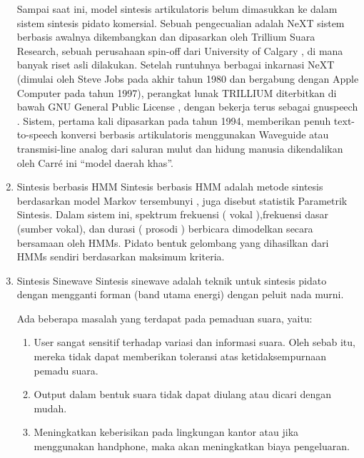 \begin{enumerate}
Sampai saat ini, model sintesis artikulatoris belum dimasukkan ke dalam sistem sintesis pidato komersial. Sebuah pengecualian adalah NeXT sistem berbasis awalnya dikembangkan dan dipasarkan oleh Trillium Suara Research, sebuah perusahaan spin-off dari University of Calgary , di mana banyak riset asli dilakukan. Setelah runtuhnya berbagai inkarnasi NeXT (dimulai oleh Steve Jobs pada akhir tahun 1980 dan bergabung dengan Apple Computer pada tahun 1997), perangkat lunak TRILLIUM diterbitkan di bawah GNU General Public License , dengan bekerja terus sebagai gnuspeech . Sistem, pertama kali dipasarkan pada tahun 1994, memberikan penuh text-to-speech konversi berbasis artikulatoris menggunakan Waveguide atau transmisi-line analog dari saluran mulut dan hidung manusia dikendalikan oleh Carré ini “model daerah khas”.
\item Sintesis berbasis HMM
Sintesis berbasis HMM  adalah metode sintesis berdasarkan model Markov tersembunyi , juga disebut statistik Parametrik Sintesis\cite{6639215}. Dalam sistem ini, spektrum frekuensi ( vokal ),frekuensi dasar (sumber vokal), dan durasi ( prosodi ) berbicara dimodelkan secara bersamaan oleh HMMs. Pidato bentuk gelombang yang dihasilkan dari HMMs sendiri berdasarkan maksimum kriteria\cite{ZEN20091039}.
\item Sintesis Sinewave
Sintesis sinewave adalah teknik untuk sintesis pidato dengan mengganti forman (band utama energi) dengan peluit nada murni.

Ada beberapa masalah yang terdapat pada pemaduan suara, yaitu:
\begin{enumerate}
\item User sangat sensitif terhadap variasi dan informasi suara. Oleh sebab itu, mereka tidak dapat memberikan toleransi atas ketidaksempurnaan pemadu suara.
\item Output dalam bentuk suara tidak dapat diulang atau dicari dengan mudah.
\item Meningkatkan keberisikan pada lingkungan kantor atau jika menggunakan handphone, maka akan meningkatkan biaya pengeluaran.
\end{enumerate}
\end{enumerate}
